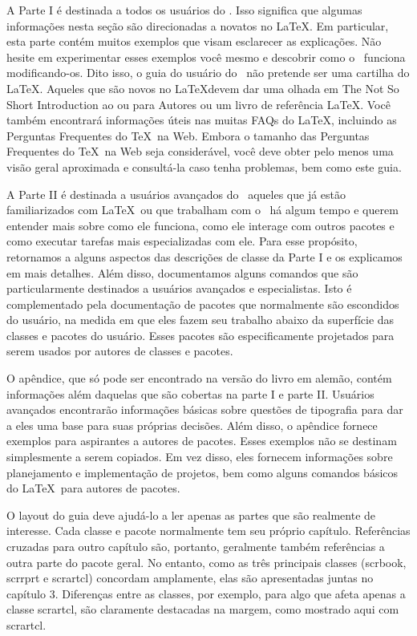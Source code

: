 A Parte I é destinada a todos os usuários do \KOMAScript. Isso significa que algumas informações nesta seção são direcionadas a novatos no \LaTeX. Em particular, esta parte contém muitos exemplos que visam esclarecer as explicações. Não hesite em experimentar esses exemplos você mesmo e descobrir como o \KOMAScript\ funciona modificando-os. Dito isso, o guia do usuário do \KOMAScript\ não pretende ser uma cartilha do \LaTeX. Aqueles que são novos no \LaTeX devem dar uma olhada em The Not So Short Introduction ao \LaTeXe ou \LaTeXe para Autores ou um livro de referência \LaTeX. Você também encontrará informações úteis nas muitas FAQs do \LaTeX, incluindo as Perguntas Frequentes do \TeX\ na Web. Embora o tamanho das Perguntas Frequentes do \TeX\ na Web seja considerável, você deve obter pelo menos uma visão geral aproximada e consultá-la caso tenha problemas, bem como este guia.

A Parte II é destinada a usuários avançados do \KOMAScript\, aqueles que já estão familiarizados com \LaTeX\ ou que trabalham com o \KOMAScript\ há algum tempo e querem entender mais sobre como ele funciona, como ele interage com outros pacotes e como executar tarefas mais especializadas com ele. Para esse propósito, retornamos a alguns aspectos das descrições de classe da Parte I e os explicamos em mais detalhes. Além disso, documentamos alguns comandos que são particularmente destinados a usuários avançados e especialistas. Isto é complementado pela documentação de pacotes que normalmente são escondidos do usuário, na medida em que eles fazem seu trabalho abaixo da superfície das classes e pacotes do usuário. Esses pacotes são especificamente projetados para serem usados por autores de classes e pacotes.

O apêndice, que só pode ser encontrado na versão do livro em alemão, contém informações além daquelas que são cobertas na parte I e parte II. Usuários avançados encontrarão informações básicas sobre questões de tipografia para dar a eles uma base para suas próprias decisões. Além disso, o apêndice fornece exemplos para aspirantes a autores de pacotes. Esses exemplos não se destinam simplesmente a serem copiados. Em vez disso, eles fornecem informações sobre planejamento e implementação de projetos, bem como alguns comandos básicos do \LaTeX\ para autores de pacotes.

O layout do guia deve ajudá-lo a ler apenas as partes que são realmente de interesse. Cada classe e pacote normalmente tem seu próprio capítulo. Referências cruzadas para outro capítulo são, portanto, geralmente também referências a outra parte do pacote geral. No entanto, como as três principais classes (scrbook, scrrprt e scrartcl) concordam amplamente, elas são apresentadas juntas no capítulo 3. Diferenças entre as classes, por exemplo, para algo que afeta apenas a classe scrartcl, são claramente destacadas na margem, como mostrado aqui com scrartcl.

